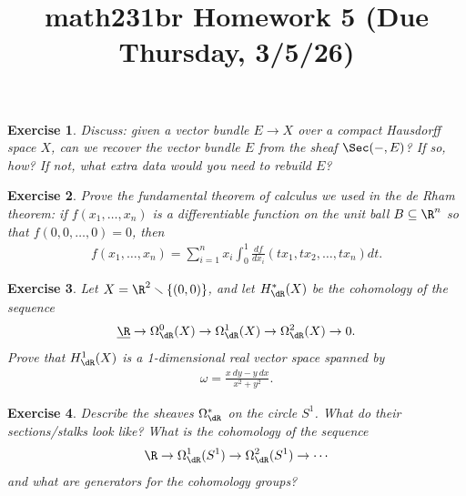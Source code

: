 \documentclass[11pt]{amsart}
\title{math231br Homework 5 (Due Thursday, 3/5/26)}
\newtheorem{hwexercise}{Exercise}
\begin{document}
\maketitle

\begin{hwexercise} Discuss: given a vector bundle $E \to X$ over a compact Hausdorff space $X$, can we recover the vector bundle $E$ from the sheaf $\Sec(-,E)$? If so, how? If not, what extra data would you need to rebuild $E$?
\end{hwexercise}


\begin{hwexercise} Prove the fundamental theorem of calculus we used in the de Rham theorem: if $f(x_1, \ldots, x_n)$ is a differentiable function on the unit ball $B \subseteq \R^n$ so that $f(0,0, \ldots, 0) = 0$, then
\begin{align*}
    f(x_1, \ldots, x_n) = \sum_{i=1}^n x_i\int_0^1 \frac{df}{dx_i}(tx_1,tx_2, \ldots, tx_n) dt.
\end{align*}
\end{hwexercise}

\begin{hwexercise}
Let $X = \R^2\minus\{(0,0)\}$, and let $H^\ast_\dR(X)$ be the cohomology of the sequence
\begin{align*}
    \underline{\R} \to \Omega^0_\dR(X) \to \Omega^1_\dR(X) \to \Omega^2_\dR(X) \to 0.
\end{align*}
Prove that $H^1_\dR(X)$ is a 1-dimensional real vector space spanned by
\begin{align*}
    \omega = \frac{x\ dy - y\ dx}{x^2+y^2}.
\end{align*}
\end{hwexercise}

\begin{hwexercise}
Describe the sheaves $\Omega^\ast_\dR$ on the circle $S^1$. What do their sections/stalks look like? What is the cohomology of the sequence
\begin{align*}
    \R \to \Omega^1_\dR(S^1) \to \Omega^2_\dR(S^1) \to \cdots
\end{align*}
and what are generators for the cohomology groups?
\end{hwexercise}
\end{document}
